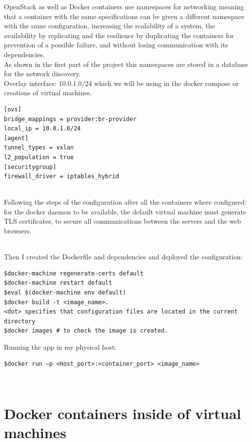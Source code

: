 OpenStack as well as Docker containers use namespaces for networking meaning that a container with the same specifications can be given a different namespace with the same configuration, increasing the scalability of a system, the availability by replicating and the resilience by duplicating the containers for prevention of a possible failure, and without losing communication with its dependencies.\\

As shown in the first part of the project this namespaces are stored in a database for the network discovery.\\

Overlay interface: 10.0.1.0/24 which we will be using in the docker compose or creations of virtual machines.\\

\begin{lstlisting}[language=bash,frame=tb,caption={OVS configuration in OpenStack}]
[ovs]
bridge_mappings = provider:br-provider
local_ip = 10.0.1.0/24
[agent]
tunnel_types = vxlan
l2_population = true
[securitygroup]
firewall_driver = iptables_hybrid
\end{lstlisting}\\

Following the steps of the configuration after all the containers where configured:
for the docker daemon to be available, the default virtual machine must generate TLS certificates, to secure all communications between the servers and the web browsers.\\\

Then I created the Dockerfile and dependencies and deployed the configuration:\\

\begin{lstlisting}
$docker-machine regenerate-certs default
$docker-machine restart default
$eval $(docker-machine env default)
$docker build -t <image_name>.
<dot> specifies that configuration files are located in the current directory
$docker images # to check the image is created.
\end{lstlisting}


Running the app in my physical host: \\
\begin{lstlisting}
$docker run –p <Host_port>:<container_port> <image_name>
\end{lstlisting}
\\

\section{Docker containers inside of virtual machines}

